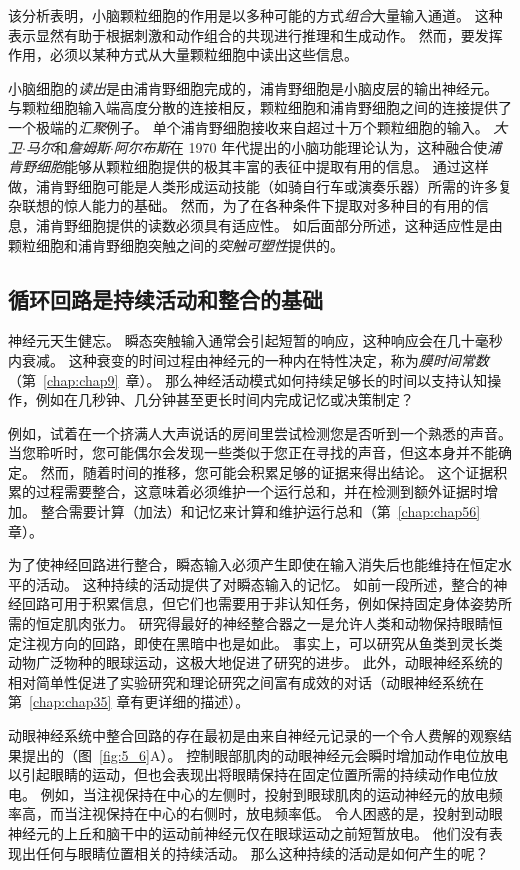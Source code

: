 该分析表明，小脑颗粒细胞的作用是以多种可能的方式\textit{组合}大量输入通道。
这种表示显然有助于根据刺激和动作组合的共现进行推理和生成动作。
然而，要发挥作用，必须以某种方式从大量颗粒细胞中读出这些信息。


小脑细胞的\textit{读出}是由浦肯野细胞完成的，浦肯野细胞是小脑皮层的输出神经元。
与颗粒细胞输入端高度分散的连接相反，颗粒细胞和浦肯野细胞之间的连接提供了一个极端的\textit{汇聚}例子。
单个浦肯野细胞接收来自超过十万个颗粒细胞的输入。
\textit{大卫$\cdot$马尔}和\textit{詹姆斯$\cdot$阿尔布斯}在 1970 年代提出的小脑功能理论认为，这种融合使\textit{浦肯野细胞}能够从颗粒细胞提供的极其丰富的表征中提取有用的信息。
通过这样做，浦肯野细胞可能是人类形成运动技能（如骑自行车或演奏乐器）所需的许多复杂联想的惊人能力的基础。
然而，为了在各种条件下提取对多种目的有用的信息，浦肯野细胞提供的读数必须具有适应性。
如后面部分所述，这种适应性是由颗粒细胞和浦肯野细胞突触之间的\textit{突触可塑性}提供的。



\subsection{循环回路是持续活动和整合的基础}

神经元天生健忘。 
瞬态突触输入通常会引起短暂的响应，这种响应会在几十毫秒内衰减。
这种衰变的时间过程由神经元的一种内在特性决定，称为\textit{膜时间常数}（第~\ref{chap:chap9}~章）。
那么神经活动模式如何持续足够长的时间以支持认知操作，例如在几秒钟、几分钟甚至更长时间内完成记忆或决策制定？


例如，试着在一个挤满人大声说话的房间里尝试检测您是否听到一个熟悉的声音。
当您聆听时，您可能偶尔会发现一些类似于您正在寻找的声音，但这本身并不能确定。
然而，随着时间的推移，您可能会积累足够的证据来得出结论。
这个证据积累的过程需要整合，这意味着必须维护一个运行总和，并在检测到额外证据时增加。
整合需要计算（加法）和记忆来计算和维护运行总和（第~\ref{chap:chap56} 章）。


为了使神经回路进行整合，瞬态输入必须产生即使在输入消失后也能维持在恒定水平的活动。
这种持续的活动提供了对瞬态输入的记忆。
如前一段所述，整合的神经回路可用于积累信息，但它们也需要用于非认知任务，例如保持固定身体姿势所需的恒定肌肉张力。
研究得最好的神经整合器之一是允许人类和动物保持眼睛恒定注视方向的回路，即使在黑暗中也是如此。
事实上，可以研究从鱼类到灵长类动物广泛物种的眼球运动，这极大地促进了研究的进步。
此外，动眼神经系统的相对简单性促进了实验研究和理论研究之间富有成效的对话（动眼神经系统在第~\ref{chap:chap35} 章有更详细的描述）。


动眼神经系统中整合回路的存在最初是由来自神经元记录的一个令人费解的观察结果提出的（图~\ref{fig:5_6}A）。
控制眼部肌肉的动眼神经元会瞬时增加动作电位放电以引起眼睛的运动，但也会表现出将眼睛保持在固定位置所需的持续动作电位放电。
例如，当注视保持在中心的左侧时，投射到眼球肌肉的运动神经元的放电频率高，而当注视保持在中心的右侧时，放电频率低。
令人困惑的是，投射到动眼神经元的上丘和脑干中的运动前神经元仅在眼球运动之前短暂放电。
他们没有表现出任何与眼睛位置相关的持续活动。
那么这种持续的活动是如何产生的呢？


